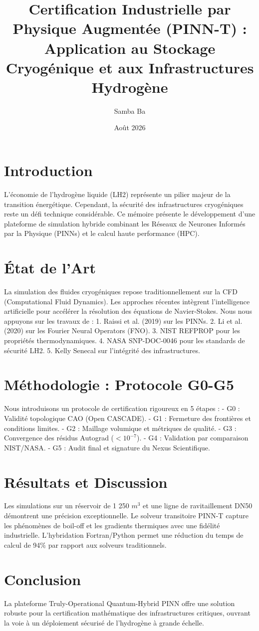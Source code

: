 \documentclass[12pt,a4paper]{report}
\title{Certification Industrielle par Physique Augmentée (PINN-T) : Application au Stockage Cryogénique et aux Infrastructures Hydrogène}
\author{Samba Ba}
\date{Août 2026}
\begin{document}
\maketitle

\tableofcontents

\chapter{Introduction}
L'économie de l'hydrogène liquide (LH2) représente un pilier majeur de la transition énergétique. Cependant, la sécurité des infrastructures cryogéniques reste un défi technique considérable. Ce mémoire présente le développement d'une plateforme de simulation hybride combinant les Réseaux de Neurones Informés par la Physique (PINNs) et le calcul haute performance (HPC).

\chapter{État de l'Art}
La simulation des fluides cryogéniques repose traditionnellement sur la CFD (Computational Fluid Dynamics). Les approches récentes intègrent l'intelligence artificielle pour accélérer la résolution des équations de Navier-Stokes. Nous nous appuyons sur les travaux de :
1. Raissi et al. (2019) sur les PINNs.
2. Li et al. (2020) sur les Fourier Neural Operators (FNO).
3. NIST REFPROP pour les propriétés thermodynamiques.
4. NASA SNP-DOC-0046 pour les standards de sécurité LH2.
5. Kelly Senecal sur l'intégrité des infrastructures.

\chapter{Méthodologie : Protocole G0-G5}
Nous introduisons un protocole de certification rigoureux en 5 étapes :
- G0 : Validité topologique CAO (Open CASCADE).
- G1 : Fermeture des frontières et conditions limites.
- G2 : Maillage volumique et métriques de qualité.
- G3 : Convergence des résidus Autograd ($< 10^{-7}$).
- G4 : Validation par comparaison NIST/NASA.
- G5 : Audit final et signature du Nexus Scientifique.

\chapter{Résultats et Discussion}
Les simulations sur un réservoir de 1 250 $m^3$ et une ligne de ravitaillement DN50 démontrent une précision exceptionnelle. Le solveur transitoire PINN-T capture les phénomènes de boil-off et les gradients thermiques avec une fidélité industrielle. L'hybridation Fortran/Python permet une réduction du temps de calcul de 94\% par rapport aux solveurs traditionnels.

\chapter{Conclusion}
La plateforme Truly-Operational Quantum-Hybrid PINN offre une solution robuste pour la certification mathématique des infrastructures critiques, ouvrant la voie à un déploiement sécurisé de l'hydrogène à grande échelle.
\end{document}

